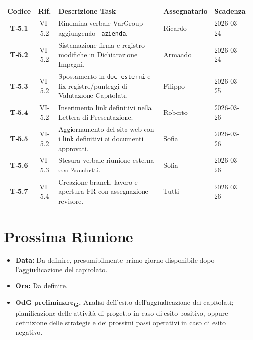 \begin{table}[ht]
	\centering
	\renewcommand{\arraystretch}{1.5}
	\begin{tabularx}{\textwidth}{c c X l l}
		\toprule
		\textbf{Codice} & \textbf{Rif.} & \textbf{Descrizione Task} & \textbf{Assegnatario} & \textbf{Scadenza} \\
		\midrule
		\textbf{T-5.1} & VI-5.2 & Rinomina verbale VarGroup aggiungendo \texttt{\_azienda}. & Ricardo & 2026-03-24 \\
		\textbf{T-5.2} & VI-5.2 & Sistemazione firma e registro modifiche in Dichiarazione Impegni. & Armando & 2026-03-24 \\
		\textbf{T-5.3} & VI-5.2 & Spostamento in \texttt{doc\_esterni} e fix registro/punteggi di Valutazione Capitolati. & Filippo & 2026-03-25 \\
		\textbf{T-5.4} & VI-5.2 & Inserimento link definitivi nella Lettera di Presentazione. & Roberto & 2026-03-26 \\
		\textbf{T-5.5} & VI-5.2 & Aggiornamento del sito web con i link definitivi ai documenti approvati. & Sofia & 2026-03-26 \\
		\textbf{T-5.6} & VI-5.3 & Stesura verbale riunione esterna con Zucchetti. & Sofia & 2026-03-26 \\
		\textbf{T-5.7} & VI-5.4 & Creazione branch, lavoro e apertura PR con assegnazione revisore. & Tutti & 2026-03-26 \\
		\bottomrule
	\end{tabularx}
\end{table}

\section{Prossima Riunione}
\begin{itemize}
	\item \textbf{Data:} {Da definire, presumibilmente primo giorno disponibile dopo l'aggiudicazione del capitolato.}
	\item \textbf{Ora:} {Da definire.}
	\item \textbf{OdG preliminare\textsubscript{G}:} Analisi dell'esito dell'aggiudicazione dei capitolati; pianificazione delle attività di progetto in caso di esito positivo, oppure definizione delle strategie e dei prossimi passi operativi in caso di esito negativo.
\end{itemize}